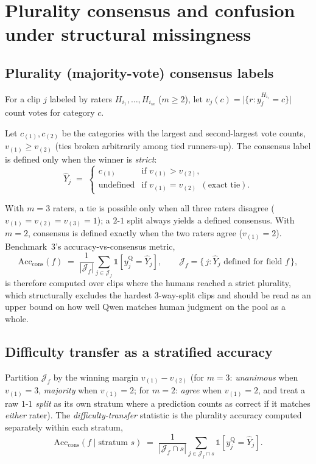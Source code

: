 \section{Plurality consensus and confusion under structural missingness}
\label{sec:consensus}

\subsection{Plurality (majority-vote) consensus labels}

For a clip $j$ labeled by raters $H_{i_1},\dots,H_{i_m}$ ($m\ge 2$), let
$v_j(c) = \big|\{r : y^{H_{i_r}}_j = c\}\big|$ count votes for category $c$.

\begin{definition}
Let $c_{(1)}, c_{(2)}$ be the categories with the largest and
second-largest vote counts, $v_{(1)} \ge v_{(2)}$ (ties broken
arbitrarily among tied runners-up). The consensus label is defined only
when the winner is \emph{strict}:
\[
  \hat{Y}_j \;=\;
  \begin{cases}
    c_{(1)} & \text{if } v_{(1)} > v_{(2)}, \\
    \text{undefined} & \text{if } v_{(1)} = v_{(2)}\ \ (\text{exact tie}).
  \end{cases}
\]
\end{definition}

With $m=3$ raters, a tie is possible only when all three raters disagree
($v_{(1)} = v_{(2)} = v_{(3)} = 1$); a $2$-$1$ split always yields a defined
consensus. With $m = 2$, consensus is defined exactly when the two raters
agree ($v_{(1)}=2$). Benchmark~3's accuracy-vs-consensus metric,
\[
  \mathrm{Acc}_{\mathrm{cons}}(f) \;=\;
  \frac{1}{|\mathcal{J}_f|}\sum_{j \in \mathcal{J}_f}
  \mathbb{1}\!\left[y^{\mathrm{Q}}_j = \hat{Y}_j\right], \qquad
  \mathcal{J}_f = \{\, j : \hat{Y}_j \text{ defined for field } f \,\},
\]
is therefore computed over clips where the humans reached a strict
plurality, which structurally excludes the hardest 3-way-split clips and
should be read as an upper bound on how well Qwen matches human judgment on
the pool as a whole.

\subsection{Difficulty transfer as a stratified accuracy}

Partition $\mathcal{J}_f$ by the winning margin $v_{(1)} - v_{(2)}$ (for
$m=3$: \emph{unanimous} when $v_{(1)}=3$, \emph{majority} when $v_{(1)}=2$;
for $m=2$: \emph{agree} when $v_{(1)}=2$, and treat a raw $1$-$1$
\emph{split} as its own stratum where a prediction counts as correct if it
matches \emph{either} rater). The \emph{difficulty-transfer} statistic is
the plurality accuracy computed separately within each stratum,
\[
  \mathrm{Acc}_{\mathrm{cons}}(f \mid \text{stratum } s)
  \;=\; \frac{1}{|\mathcal{J}_f \cap s|}\sum_{j \in \mathcal{J}_f \cap s}
  \mathbb{1}\!\left[y^{\mathrm{Q}}_j = \hat{Y}_j\right].
\]


